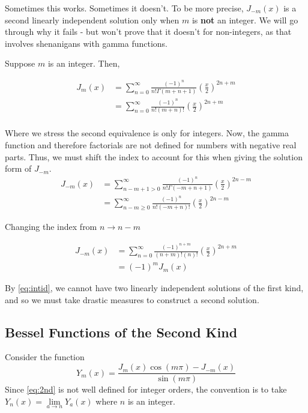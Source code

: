 \documentclass[]{article}
\begin{document}
Sometimes this works. Sometimes it doesn't. To be more precise, $J_{-m}(x)$ is a second linearly independent solution only when $m$ is \textbf{not} an integer. We will go through why it fails - but won't prove that it doesn't for non-integers, as that involves shenanigans with gamma functions.

Suppose $m$ is an integer. Then,

\begin{align*}
	J_{m}(x) &=\sum_{n = 0}^{\infty} \frac{(-1)^n}{n!\Gamma(m+n+1)}
	 \left(\frac{x}{2}\right)^{2n+m}\\
 	&= \sum_{n=0}^{\infty}\frac{(-1)^n}{n!(m+n)!}
	 \left(\frac{x}{2}\right)^{2n+m} \\
\end{align*}

Where we stress the second equivalence is only for integers. Now, the gamma function and therefore factorials are not defined for numbers with negative real parts. Thus, we must shift the index to account for this when giving the solution form of $J_{-m}$.
\begin{align}
 J_{-m}(x) &=\sum_{n-m+1 > 0}^{\infty} \frac{(-1)^n}{n!\Gamma(-m+n+1)}
 	 \left(\frac{x}{2}\right)^{2n-m} \label{eq:njm}\\
 	 &=\sum_{n-m \geq 0}^{\infty}\frac{(-1)^n}{n!(-m+n)!}
 	\left(\frac{x}{2}\right)^{2n-m} \label{eq:njm2}
\end{align}

Changing the index from $n \to n-m$

\begin{align}
 J_{-m}(x) &=\sum_{n=0}^{\infty}\frac{(-1)^{n+m}}{(n+m)!(n)!}
 	\left(\frac{x}{2}\right)^{2n+m} \label{eq:njm4}\\
 	&= (-1)^m J_{m}(x) \label{eq:intid}
\end{align}

By \eqref{eq:intid}, we cannot have two linearly independent solutions of the first kind, and so we must take drastic measures to construct a second solution.
\newpage
\subsection{Bessel Functions of the Second Kind}
Consider the function
\begin{equation} \label{eq:2nd}
Y_m(x) = \frac{J_m(x)\cos(m\pi)-J_{-m}(x)}{\sin(m\pi)}
\end{equation}
Since \eqref{eq:2nd} is not well defined for integer orders, the convention is to take $Y_n(x) = \lim\limits_{a \to n} Y_{a}(x)$ where $n$ is an integer.
\end{document}
